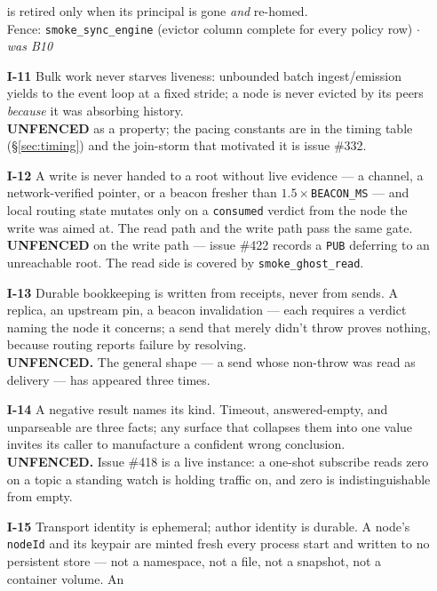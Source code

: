 \documentclass[nobib]{tufte-handout}
\begin{document}
\begin{enumerate}
  is retired only when its principal is gone \emph{and} re-homed.\\
  {\footnotesize\textsf{Fence:} \texttt{smoke\_sync\_engine} (evictor
  column complete for every policy row) $\cdot$ \emph{was B10}}
\item[\textbf{I-11}] Bulk work never starves liveness: unbounded batch
  ingest/emission yields to the event loop at a fixed stride; a node is
  never evicted by its peers \emph{because} it was absorbing history.\\
  {\footnotesize\textbf{UNFENCED} as a property; the pacing constants
  are in the timing table (\S\ref{sec:timing}) and the join-storm that
  motivated it is issue \#332.}
\item[\textbf{I-12}] A write is never handed to a root without live
  evidence --- a channel, a network-verified pointer, or a beacon
  fresher than $1.5\times$\texttt{BEACON\_MS} --- and local routing
  state mutates only on a \texttt{consumed} verdict from the node the
  write was aimed at. The read path and the write path pass the same
  gate.\\
  {\footnotesize\textbf{UNFENCED} on the write path --- issue \#422
  records a \texttt{PUB} deferring to an unreachable root. The read side
  is covered by \texttt{smoke\_ghost\_read}.}
\item[\textbf{I-13}] Durable bookkeeping is written from receipts,
  never from sends. A replica, an upstream pin, a beacon invalidation
  --- each requires a verdict naming the node it concerns; a send that
  merely didn't throw proves nothing, because routing reports failure
  by resolving.\\
  {\footnotesize\textbf{UNFENCED.} The general shape --- a send whose
  non-throw was read as delivery --- has appeared three times.}
\item[\textbf{I-14}] A negative result names its kind. Timeout,
  answered-empty, and unparseable are three facts; any surface that
  collapses them into one value invites its caller to manufacture a
  confident wrong conclusion.\\
  {\footnotesize\textbf{UNFENCED.} Issue \#418 is a live instance: a
  one-shot subscribe reads zero on a topic a standing watch is holding
  traffic on, and zero is indistinguishable from empty.}
\item[\textbf{I-15}] Transport identity is ephemeral; author identity
  is durable. A node's \texttt{nodeId} and its keypair are minted fresh
  every process start and written to no persistent store --- not a
  namespace, not a file, not a snapshot, not a container volume. An

\end{enumerate}
\end{document}
